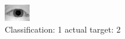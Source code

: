 \begin{figure}[h!]
\begin{center}
\includegraphics[width=0.60\columnwidth]{figures/ID919_class_1_target_2.png}
\end{center}
\caption{ Classification: 1 actual target: 2}
\label{fig:ID919_class_1_target_2}
\end{figure}
